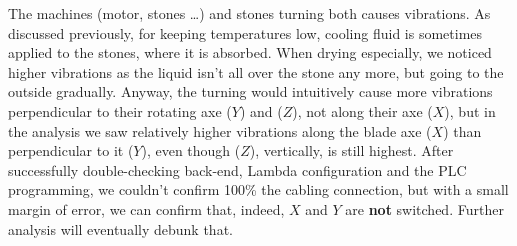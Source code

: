 The machines (motor, stones \dots) and stones turning both causes vibrations. As discussed previously, for keeping temperatures low, cooling fluid is sometimes applied to the stones, 
where it is absorbed. When drying especially, we noticed higher vibrations as the liquid isn't all over the stone any more, but going to the outside gradually.
Anyway, the turning would intuitively cause more vibrations perpendicular to their rotating axe ($Y$) and ($Z$), not along their axe ($X$), 
but in the analysis we saw relatively higher vibrations along the blade axe ($X$) than perpendicular to it ($Y$), even though ($Z$), vertically, is still highest. 
After successfully double-checking back-end, Lambda configuration and the \ac{PLC} programming, we couldn't confirm 100\% the cabling connection, but with a small margin of 
error, we can confirm that, indeed, $X$ and $Y$ are \textbf{not} switched. Further analysis will eventually debunk that. 


